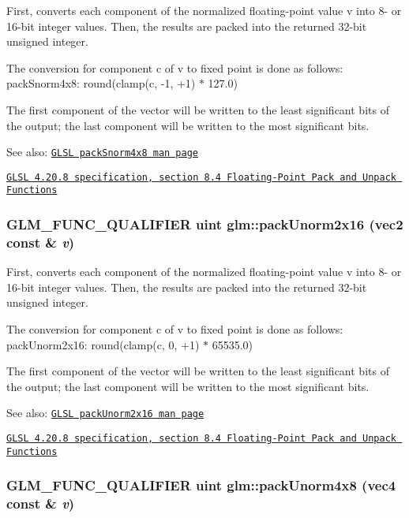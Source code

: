First, converts each component of the normalized floating-point value v into 8- or 16-bit integer values. Then, the results are packed into the returned 32-bit unsigned integer.

The conversion for component c of v to fixed point is done as follows: packSnorm4x8: round(clamp(c, -1, +1) $\ast$ 127.0)

The first component of the vector will be written to the least significant bits of the output; the last component will be written to the most significant bits.

\begin{Desc}
\item[See also:]\href{http://www.opengl.org/sdk/docs/manglsl/xhtml/packSnorm4x8.xml}{\tt GLSL packSnorm4x8 man page} 

\href{http://www.opengl.org/registry/doc/GLSLangSpec.4.20.8.pdf}{\tt GLSL 4.20.8 specification, section 8.4 Floating-Point Pack and Unpack Functions} \end{Desc}
\hypertarget{group__core__func__packing_g0659ddaf09727551c7bf51655d2a65cf}{
\subsubsection[packUnorm2x16]{\setlength{\rightskip}{0pt plus 5cm}GLM\_\-FUNC\_\-QUALIFIER uint glm::packUnorm2x16 (vec2 const \& {\em v})}}
\label{group__core__func__packing_g0659ddaf09727551c7bf51655d2a65cf}


First, converts each component of the normalized floating-point value v into 8- or 16-bit integer values. Then, the results are packed into the returned 32-bit unsigned integer.

The conversion for component c of v to fixed point is done as follows: packUnorm2x16: round(clamp(c, 0, +1) $\ast$ 65535.0)

The first component of the vector will be written to the least significant bits of the output; the last component will be written to the most significant bits.

\begin{Desc}
\item[See also:]\href{http://www.opengl.org/sdk/docs/manglsl/xhtml/packUnorm2x16.xml}{\tt GLSL packUnorm2x16 man page} 

\href{http://www.opengl.org/registry/doc/GLSLangSpec.4.20.8.pdf}{\tt GLSL 4.20.8 specification, section 8.4 Floating-Point Pack and Unpack Functions} \end{Desc}
\hypertarget{group__core__func__packing_g834ee9a9e73dcb0a7c1fc88143f3edb8}{
\subsubsection[packUnorm4x8]{\setlength{\rightskip}{0pt plus 5cm}GLM\_\-FUNC\_\-QUALIFIER uint glm::packUnorm4x8 (vec4 const \& {\em v})}}
\label{group__core__func__packing_g834ee9a9e73dcb0a7c1fc88143f3edb8}


